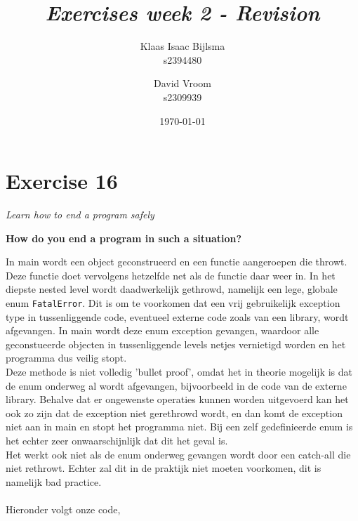 \documentclass[12pt]{article}
\title{\itshape Exercises week 2 - Revision}
\author{
	Klaas Isaac Bijlsma \\ s2394480
	\and
	David Vroom \\ s2309939
}
\date{\today}
\newcommand{\desc}[1]{\textit{#1} \vspace{1em}}
\begin{document}
\maketitle

\section*{Exercise 16}
\desc{Learn how to end a program safely}

\textbf{How do you end a program in such a situation?}

In main wordt een object geconstrueerd en een functie aangeroepen die throwt. Deze functie doet vervolgens hetzelfde net als de functie daar weer in. In het diepste nested level wordt daadwerkelijk gethrowd, namelijk een lege, globale enum \texttt{FatalError}. Dit is om te voorkomen dat een vrij gebruikelijk exception type in tussenliggende code, eventueel externe code zoals van een library, wordt afgevangen. In main wordt deze enum exception gevangen, waardoor alle geconstueerde objecten in tussenliggende levels netjes vernietigd worden en het programma dus veilig stopt.\\
Deze methode is niet volledig 'bullet proof', omdat het in theorie mogelijk is dat de enum onderweg al wordt afgevangen, bijvoorbeeld in de code van de externe library. Behalve dat er ongewenste operaties kunnen worden uitgevoerd kan het ook zo zijn dat de exception niet gerethrowd wordt, en dan komt de exception niet aan in main en stopt het programma niet. Bij een zelf gedefinieerde enum is het echter zeer onwaarschijnlijk dat dit het geval is. \\
Het werkt ook niet als de enum onderweg gevangen wordt door een catch-all die niet rethrowt. Echter zal dit in de praktijk niet moeten voorkomen, dit is namelijk bad practice. \\
\\
Hieronder volgt onze code,










\end{document}
